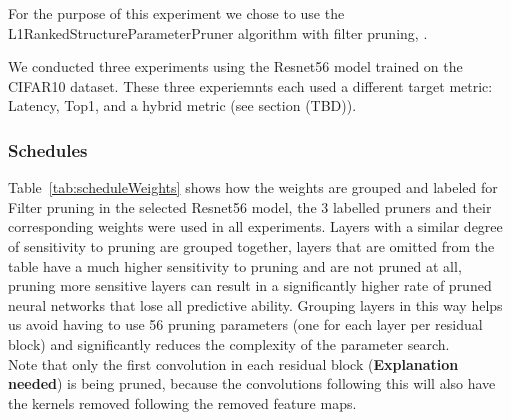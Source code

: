 \documentclass[../Dissertation.tex]{subfiles}
\begin{document}
For the purpose of this experiment we chose to use the L1RankedStructureParameterPruner algorithm with filter pruning, .

We conducted three experiments using the Resnet56 model trained on the CIFAR10 dataset. 
These three experiemnts each used a different target metric: Latency, Top1, and a hybrid metric (see section (TBD)).

\newpage
\subsubsection{Schedules}
Table~\ref{tab:scheduleWeights} shows how the weights are grouped and labeled for Filter pruning in the selected Resnet56 model, the 3 labelled pruners and their corresponding weights were used in all experiments.
Layers with a similar degree of sensitivity to pruning are grouped together, layers that are omitted from the table have a much higher sensitivity to pruning and are not pruned at all, pruning more sensitive layers can result in a significantly higher rate of pruned neural networks that lose all predictive ability.
Grouping layers in this way helps us avoid having to use 56 pruning parameters (one for each layer per residual block) and significantly reduces the complexity of the parameter search.\\

Note that only the first convolution in each residual block (\textbf{Explanation needed}) is being pruned, because the convolutions following this will also have the kernels removed following the removed feature maps.
\end{document}
